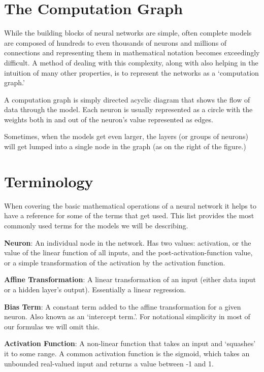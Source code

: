 \documentclass[]{book}
\theoremstyle{definition}
\theoremstyle{definition}
\theoremstyle{definition}
\theoremstyle{remark}
\begin{document}
\section{The Computation Graph}\label{the-computation-graph}

While the building blocks of neural networks are simple, often complete
models are composed of hundreds to even thousands of neurons and
millions of connections and representing them in mathematical notation
becomes exceedingly difficult. A method of dealing with this complexity,
along with also helping in the intuition of many other properties, is to
represent the networks as a `computation graph.'

A computation graph is simply directed acyclic diagram that shows the
flow of data through the model. Each neuron is usually represented as a
circle with the weights both in and out of the neuron's value
represented as edges.

Sometimes, when the models get even larger, the layers (or groups of
neurons) will get lumped into a single node in the graph (as on the
right of the figure.)

\section{Terminology}\label{terminology}

When covering the basic mathematical operations of a neural network it
helps to have a reference for some of the terms that get used. This list
provides the most commonly used terms for the models we will be
describing.

\textbf{Neuron}: An individual node in the network. Has two values:
activation, or the value of the linear function of all inputs, and the
post-activation-function value, or a simple transformation of the
activation by the activation function.

\textbf{Affine Transformation}: A linear transformation of an input
(either data input or a hidden layer's output). Essentially a linear
regression.

\textbf{Bias Term}: A constant term added to the affine transformation
for a given neuron. Also known as an `intercept term.'. For notational
simplicity in most of our formulas we will omit this.

\textbf{Activation Function}: A non-linear function that takes an input
and `squashes' it to some range. A common activation function is the
sigmoid, which takes an unbounded real-valued input and returns a value
between -1 and 1.
\end{document}
